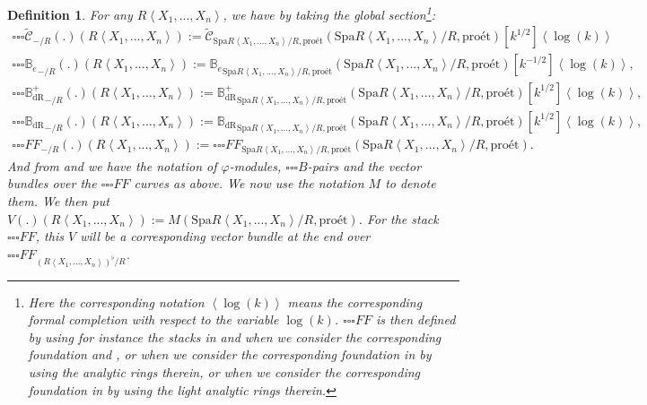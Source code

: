 \documentclass[12pt]{book}
\newtheorem{definition}{Definition}
\begin{document}
\begin{definition}
For any $R\left<X_1,...,X_n\right>$, we have by taking the global section\footnote{Here the corresponding notation $\left<\log(k)\right>$ means the corresponding formal completion with respect to the variable $\log(k)$. ${\square\square\square}{{FF}}$ is then defined by using for instance the stacks in \cite{BK} and \cite{BBBK} when we consider the corresponding foundation \cite{BK} and \cite{BBBK}, or \cite{CS2} when we consider the corresponding foundation in \cite{CS2} by using the analytic rings therein, or \cite{CS3} when we consider the corresponding foundation in \cite{CS3} by using the light analytic rings therein.}:
\begin{align}
{\square\square\square}\widetilde{\mathcal{C}}_{-/R}(.)(R\left<X_1,...,X_n\right>):=\widetilde{\mathcal{C}}_{\mathrm{Spa}R\left<X_1,...,X_n\right>/R,\text{pro\'et}}(\mathrm{Spa}R\left<X_1,...,X_n\right>/R,\text{pro\'et})[k^{1/2}]\left<\log(k)\right>\\
{\square\square\square}{\mathbb{B}_e}_{-/R}(.)(R\left<X_1,...,X_n\right>):={\mathbb{B}_e}_{\mathrm{Spa}R\left<X_1,...,X_n\right>/R,\text{pro\'et}}(\mathrm{Spa}R\left<X_1,...,X_n\right>/R,\text{pro\'et})[k^{-1/2}]\left<\log(k)\right>,\\
{\square\square\square}{\mathbb{B}_\mathrm{dR}^+}_{-/R}(.)(R\left<X_1,...,X_n\right>):={\mathbb{B}_\mathrm{dR}^+}_{\mathrm{Spa}R\left<X_1,...,X_n\right>/R,\text{pro\'et}}(\mathrm{Spa}R\left<X_1,...,X_n\right>/R,\text{pro\'et})[k^{1/2}]\left<\log(k)\right>,\\
{\square\square\square}{\mathbb{B}_\mathrm{dR}}_{-/R}(.)(R\left<X_1,...,X_n\right>):={\mathbb{B}_\mathrm{dR}}_{\mathrm{Spa}R\left<X_1,...,X_n\right>/R,\text{pro\'et}}(\mathrm{Spa}R\left<X_1,...,X_n\right>/R,\text{pro\'et})[k^{1/2}]\left<\log(k)\right>,\\
{\square\square\square}{{FF}}_{-/R}(.)(R\left<X_1,...,X_n\right>):={\square\square\square}{FF}_{\mathrm{Spa}R\left<X_1,...,X_n\right>/R,\text{pro\'et}}(\mathrm{Spa}R\left<X_1,...,X_n\right>/R,\text{pro\'et}).
\end{align}
And from \cite[Definition 9.3.3, Definition 9.3.5, Definition 9.3.11, Definition 9.3.9]{KL1} and \cite{KL2} we have the notation of $\varphi$-modules, ${\square\square\square}B$-pairs and the vector bundles over the ${\square\square\square}FF$ curves as above. We now use the notation $M$ to denote them. We then put $V(.)(R\left<X_1,...,X_n\right>):=M(\mathrm{Spa}R\left<X_1,...,X_n\right>/R,\text{pro\'et})$. For the stack ${\square\square\square}FF$, this $V$ will be a corresponding vector bundle at the end over ${\square\square\square}FF_{(R\left<X_1,...,X_n\right>)^\flat/R}$. 	
\end{definition}
  
\end{document}

